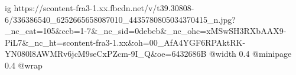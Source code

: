 
 
 
 
 

\ifcmt
  ig https://scontent-fra3-1.xx.fbcdn.net/v/t39.30808-6/336386540_6252665658087010_4435780805034370415_n.jpg?_nc_cat=105&ccb=1-7&_nc_sid=0debeb&_nc_ohc=xMSwSH3RXbAAX9-PiL7&_nc_ht=scontent-fra3-1.xx&oh=00_AfA4YGF6RPAktRK-YN080l8AWMRv6jcM9seCxPZcm-9I_Q&oe=6432686B
  @width 0.4
  @minipage 0.4
  @wrap \parpic[r]
\fi
